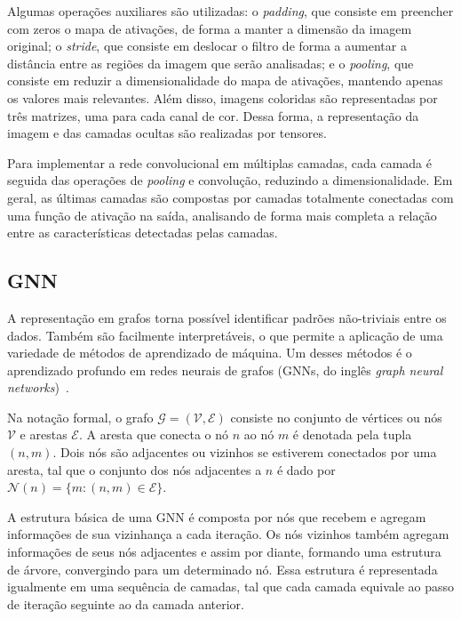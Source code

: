 Algumas operações auxiliares são utilizadas: o \textit{padding}, que consiste em
preencher com zeros o mapa de ativações, de forma a manter a dimensão da imagem
original; o \textit{stride}, que consiste em deslocar o filtro de forma a
aumentar a distância entre as regiões da imagem que serão analisadas; e o
\textit{pooling}, que consiste em reduzir a dimensionalidade do mapa de
ativações, mantendo apenas os valores mais relevantes. Além disso, imagens
coloridas são representadas por três matrizes, uma para cada canal de cor. Dessa
forma, a representação da imagem e das camadas ocultas são realizadas por
tensores.

Para implementar a rede convolucional em múltiplas camadas, cada camada é
seguida das operações de \textit{pooling} e convolução, reduzindo a
dimensionalidade. Em geral, as últimas camadas são compostas por camadas
totalmente conectadas com uma função de ativação na saída, analisando de forma
mais completa a relação entre as características detectadas pelas camadas.

\subsection{GNN}
A representação em grafos torna possível identificar padrões
não-triviais entre os dados. Também são facilmente interpretáveis, o que
permite a aplicação de uma variedade de métodos de aprendizado de máquina. Um
desses métodos é o aprendizado profundo em redes neurais de grafos (GNNs, do
inglês \textit{graph neural networks})~\cite{Bishop:DeepLearning24}.


Na notação formal, o grafo $\mathcal{G} = (\mathcal{V}, \mathcal{E})$ consiste no conjunto de
vértices ou nós $\mathcal{V}$ e arestas $\mathcal{E}$. A aresta que conecta
o nó $n$ ao nó $m$ é denotada pela tupla $(n, m)$. Dois nós são adjacentes ou vizinhos
se estiverem conectados por uma aresta, tal que o conjunto dos nós adjacentes a $n$
é dado por $\mathcal{N}(n) = \{m : (n, m) \in \mathcal{E}\}$.

A estrutura básica de uma GNN é composta por nós que recebem e agregam
informações de sua vizinhança a cada iteração. Os nós vizinhos também agregam
informações de seus nós adjacentes e assim por diante, formando uma estrutura de
árvore, convergindo para um determinado nó. Essa estrutura é representada
igualmente em uma sequência de camadas, tal que cada camada equivale ao passo de
iteração seguinte ao da camada anterior.

